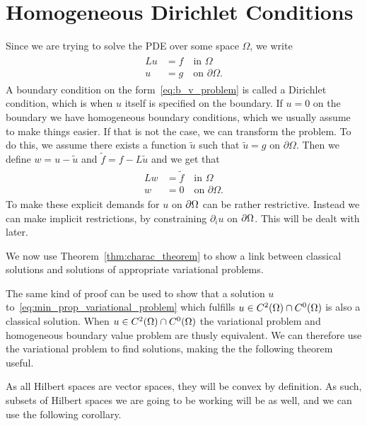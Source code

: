\section{Homogeneous Dirichlet Conditions}
Since we are trying to solve the PDE over some space $\Omega$, we write
\begin{align}
\begin{split}
    Lu &= f \quad \text{in } \Omega \label{eq:b_v_problem} \\
    u &= g \quad \text{on } \partial \Omega.
\end{split}
\end{align}
A boundary condition on the form~\eqref{eq:b_v_problem} is called a 
Dirichlet condition, which is when $u$ itself is specified on the boundary. 
If $u=0$ on the boundary we have homogeneous boundary conditions, which we usually assume 
to make things easier. If that is not the case, we can
transform the problem. To do this, we assume there exists a function 
$\tilde{u}$ such that $\tilde{u}=g$ on $\partial \Omega$. Then we define 
$w = u - \tilde{u}$ and $\tilde{f}=f-L\tilde{u}$ and we get that
\begin{align}
\begin{split}
    Lw &= \tilde{f} \quad \text{in } \Omega \label{eq:b_v_problem_homogeneous} \\
    w &= 0 \quad \text{on } \partial \Omega. 
\end{split}
\end{align}
To make these explicit demands for $u$ on $\partial \Omega$ can 
be rather restrictive.
Instead we can make implicit restrictions, by constraining 
$\partial _i u$ on $\partial \Omega$.
This will be dealt with later.

We now use Theorem~\ref{thm:charac_theorem} to show a link between classical 
solutions and solutions of appropriate variational problems.

The same kind of proof can be used to show that a solution $u$ to~\eqref{eq:min_prop_variational_problem} which fulfills 
$u\in C^2(\Omega) \cap C^0(\Omega)$ is also a classical solution. 
When $u\in C^2(\Omega) \cap C^0(\Omega)$ the variational problem and 
homogeneous boundary value problem are thusly equivalent.
We can therefore use the variational problem to find solutions, making the
 the following theorem useful.

As all Hilbert spaces are vector spaces, they will be convex by definition.
As such, subsets of Hilbert spaces we are going to be working will be as well,
and we can use the following corollary.



